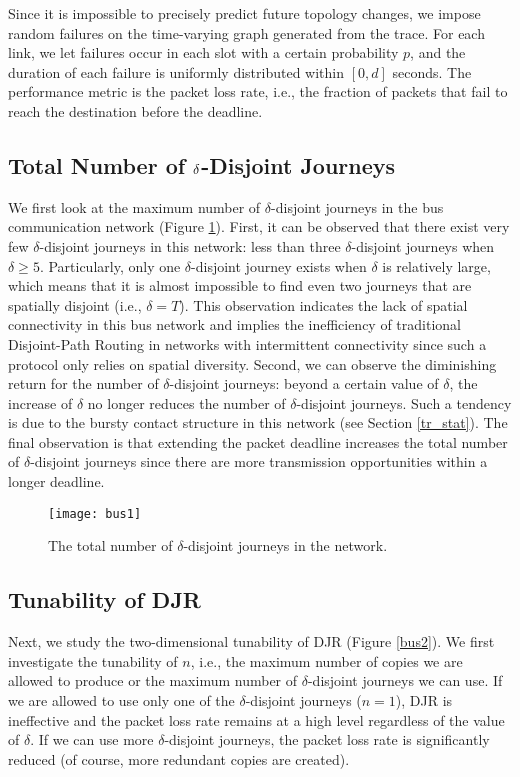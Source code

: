 \documentclass[10pt, conference, letterpaper]{IEEEtran}
\begin{document}
Since it is impossible to precisely predict future topology changes, we impose random failures on the time-varying graph generated from the trace. For each link, we let failures occur in each slot with a certain probability $p$, and the duration of each failure is uniformly distributed within $[0,d]$ seconds. The performance metric is the packet loss rate, i.e., the fraction of packets that fail to reach the destination before the deadline.
\subsection{Total Number of $\mathlarger{\delta}$-Disjoint Journeys}
We first look at the maximum number of $\delta$-disjoint journeys in the bus communication network (Figure \ref{bus1}). First, it can be observed that there exist very few $\delta$-disjoint journeys in this network: less than three $\delta$-disjoint journeys when $\delta\ge 5$. Particularly, only one $\delta$-disjoint journey exists when $\delta$ is relatively large, which means that it is almost impossible to find even two journeys that are spatially disjoint (i.e., $\delta=T$). This observation indicates the lack of spatial connectivity in this bus network and implies the inefficiency of traditional Disjoint-Path Routing in networks with intermittent connectivity since such a protocol only relies on spatial diversity. Second, we can observe the diminishing return for the number of $\delta$-disjoint journeys: beyond a certain value of $\delta$, the increase of $\delta$ no longer reduces the number of $\delta$-disjoint journeys. Such a tendency is due to the bursty contact structure in this network (see Section \ref{tr_stat}). The final observation is that extending the packet deadline increases the total number of $\delta$-disjoint journeys since there are more transmission opportunities within a longer deadline.



\begin{figure}[t]
\begin{center}
\texttt{[image: bus1]}
\caption{The total number of $\delta$-disjoint journeys in the network.}
\label{bus1}\vspace{-3mm}
\end{center}
\end{figure}

\subsection{Tunability of DJR}
Next, we study the two-dimensional tunability of DJR (Figure \ref{bus2}). We first investigate the tunability of $n$, i.e., the maximum number of copies we are allowed to produce or the maximum number of $\delta$-disjoint journeys we can use. If we are  allowed to use only one of the $\delta$-disjoint journeys ($n=1$), DJR is ineffective and the packet loss rate remains at a high level regardless of the value of $\delta$. If we can use more $\delta$-disjoint journeys, the packet loss rate is significantly reduced (of course, more redundant copies are created).
\end{document}
